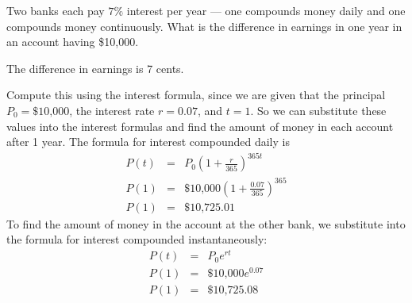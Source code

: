 \documentclass{ximera}
\begin{document}
\begin{computerExercise} \label{c3.1.8}
Two banks each pay $7\%$ interest per year --- one compounds money
daily and one compounds money continuously.  What is the difference
in earnings in one year in an account having \$10,000.

\begin{solution}

\ans The difference in earnings is 7 cents.

\soln Compute this using the interest
formula, since we are given that the principal $P_0 = \$10\mbox{,}000$,
the interest rate $r = 0.07$, and $t = 1$.  So we can substitute
these values into the interest formulas and find the amount of money
in each account after 1 year.  The formula for interest compounded daily is
\[ \begin{array}{rcl}
P(t) & = & P_0\left(1 + \frac{r}{365}\right)^{365t} \\
P(1) & = & \$10\mbox{,}000\left(1 + \frac{0.07}{365}\right)^{365} \\
P(1) & = & \$10\mbox{,}725.01\end{array}
\]
To find the amount of money in the account at the other bank, we substitute
into the formula for interest compounded instantaneously:
\[ \begin{array}{rcl}
P(t) & = & P_0e^{rt} \\
P(1) & = & \$10\mbox{,}000e^{0.07} \\
P(1) & = & \$10\mbox{,}725.08\end{array}
\]

\end{solution}
\end{computerExercise}
\end{document}
